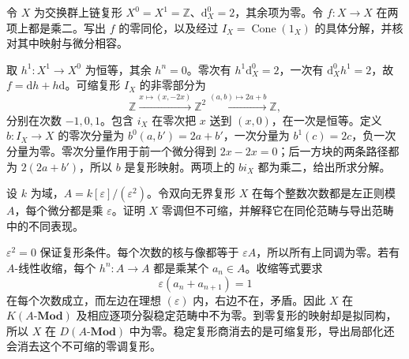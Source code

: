 \begin{exercise}\label{b4:ex:D-explicit-nullhomotopy-factorization}
	令 \(X\) 为交换群上链复形 \(X^0=X^1=\mathbb Z\)、\(\mathrm{d}_X^0=2\)，其余项为零。令 \(f:X\to X\) 在两项上都是乘二。写出 \(f\) 的零同伦，以及经过 \(I_X=\operatorname{Cone}(1_X)\) 的具体分解，并核对其中映射与微分相容。
\end{exercise}
\begin{solution}
	取 \(h^1:X^1\to X^0\) 为恒等，其余 \(h^n=0\)。零次有 \(h^1\mathrm{d}_X^0=2\)，一次有 \(\mathrm{d}_X^0h^1=2\)，故 \(f=\mathrm{d}h+h\mathrm{d}\)。可缩复形 \(I_X\) 的非零部分为
	\[
		\mathbb Z\xrightarrow{x\mapsto(x,-2x)}\mathbb Z^2 \xrightarrow{(a,b)\mapsto2a+b}\mathbb Z,
	\]
	分别在次数 \(-1,0,1\)。包含 \(i_X\) 在零次把 \(x\) 送到 \((x,0)\)，在一次是恒等。定义 \(b:I_X\to X\) 的零次分量为 \(b^0(a,b')=2a+b'\)，一次分量为 \(b^1(c)=2c\)，负一次分量为零。零次分量作用于前一个微分得到 \(2x-2x=0\)；后一方块的两条路径都为 \(2(2a+b')\)，所以 \(b\) 是复形映射。两项上的 \(bi_X\) 都为乘二，给出所求分解。
\end{solution}

\begin{exercise}\label{b4:ex:D-acyclic-not-stably-zero}
	设 \(k\) 为域，\(A=k[\varepsilon]/(\varepsilon^2)\)。令双向无界复形 \(X\) 在每个整数次数都是左正则模 \(A\)，每个微分都是乘 \(\varepsilon\)。证明 \(X\) 零调但不可缩，并解释它在同伦范畴与导出范畴中的不同表现。
\end{exercise}
\begin{solution}
	\(\varepsilon^2=0\) 保证复形条件。每个次数的核与像都等于 \(\varepsilon A\)，所以所有上同调为零。若有 \(A\)-线性收缩，每个 \(h^n:A\to A\) 都是乘某个 \(a_n\in A\)。收缩等式要求
	\[
		\varepsilon(a_n+a_{n+1})=1
	\]
	在每个次数成立，而左边在理想 \((\varepsilon)\) 内，右边不在，矛盾。因此 \(X\) 在 \(K(A\text{-}\mathbf{Mod})\) 及相应逐项分裂稳定范畴中不为零。到零复形的映射却是拟同构，所以 \(X\) 在 \(D(A\text{-}\mathbf{Mod})\) 中为零。稳定复形商消去的是可缩复形，导出局部化还会消去这个不可缩的零调复形。
\end{solution}

